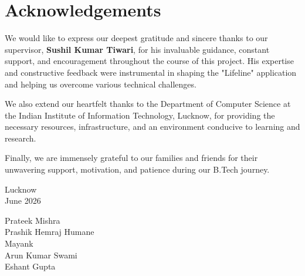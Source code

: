 \chapter*{Acknowledgements}


We would like to express our deepest gratitude and sincere thanks to our supervisor, \textbf{Sushil Kumar Tiwari}, for his invaluable guidance, constant support, and encouragement throughout the course of this project. His expertise and constructive feedback were instrumental in shaping the "Lifeline" application and helping us overcome various technical challenges.

We also extend our heartfelt thanks to the Department of Computer Science at the Indian Institute of Information Technology, Lucknow, for providing the necessary resources, infrastructure, and an environment conducive to learning and research.

Finally, we are immensely grateful to our families and friends for their unwavering support, motivation, and patience during our B.Tech journey.

\vspace{3cm}

\noindent
\begin{minipage}[t]{0.5\textwidth}
Lucknow\\
June 2026
\end{minipage}%
\begin{minipage}[t]{0.5\textwidth}
\begin{flushright}
Prateek Mishra\\
Prashik Hemraj Humane\\
Mayank\\
Arun Kumar Swami\\
Eshant Gupta
\end{flushright}
\end{minipage}

